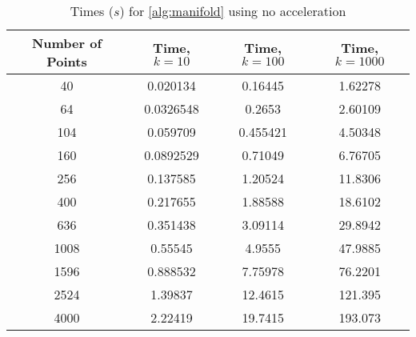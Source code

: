 \begin{table}[ht!]
    \centering
    {\footnotesize
        \begin{tabular}{| c | c c c |}
            \hline
            Number of Points  &  Time, $k=10$  & Time, $k=100$  &  Time, $k=1000$ \\
            \hline
            40  &  0.020134   &    0.16445     &     1.62278 \\
            64  &  0.0326548  &    0.2653      &     2.60109 \\
            104  &  0.059709   &    0.455421    &     4.50348 \\ 
            160  &  0.0892529  &    0.71049     &     6.76705 \\
            256  &  0.137585   &    1.20524     &    11.8306 \\
            400  &  0.217655   &    1.88588     &    18.6102 \\
            636  &  0.351438   &    3.09114     &    29.8942 \\
            1008  &  0.55545    &    4.9555      &    47.9885 \\
            1596  &  0.888532   &    7.75978     &    76.2201 \\
            2524  &  1.39837    &   12.4615      &   121.395 \\
            4000  &  2.22419    &   19.7415      &   193.073 \\
            \hline
        \end{tabular}
    }
    \caption{Times ($s$) for \autoref{alg:manifold} using no acceleration}
    \label{tb:nothing}
\end{table}

